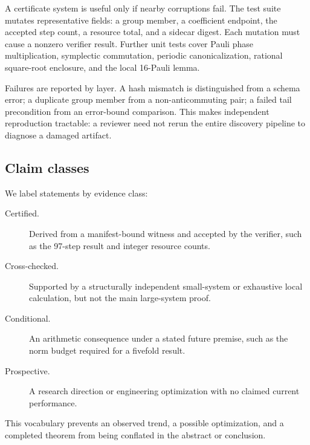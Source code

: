 A certificate system is useful only if nearby corruptions fail.  The test
suite mutates representative fields: a group member, a coefficient endpoint,
the accepted step count, a resource total, and a sidecar digest.  Each mutation
must cause a nonzero verifier result.  Further unit tests cover Pauli phase
multiplication, symplectic commutation, periodic canonicalization, rational
square-root enclosure, and the local 16-Pauli lemma.

Failures are reported by layer.  A hash mismatch is distinguished from a
schema error; a duplicate group member from a non-anticommuting pair; a failed
tail precondition from an error-bound comparison.  This makes independent
reproduction tractable: a reviewer need not rerun the entire discovery
pipeline to diagnose a damaged artifact.

\subsection{Claim classes}

We label statements by evidence class:
\begin{description}
  \item[Certified.] Derived from a manifest-bound witness and accepted by the
  verifier, such as the 97-step result and integer resource counts.
  \item[Cross-checked.] Supported by a structurally independent small-system or
  exhaustive local calculation, but not the main large-system proof.
  \item[Conditional.] An arithmetic consequence under a stated future premise,
  such as the norm budget required for a fivefold result.
  \item[Prospective.] A research direction or engineering optimization with no
  claimed current performance.
\end{description}
This vocabulary prevents an observed trend, a possible optimization, and a
completed theorem from being conflated in the abstract or conclusion.
